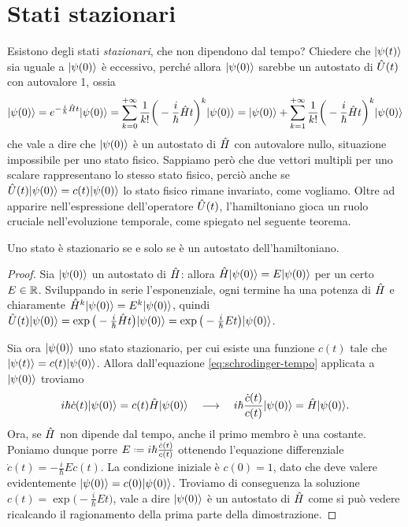 \section{Stati stazionari}
Esistono degli stati \emph{stazionari}, che non dipendono dal tempo?
Chiedere che $\lvert\psi(t)\rangle$ sia uguale a $\lvert\psi(0)\rangle$ è eccessivo, perch\'e allora $\lvert\psi(0)\rangle$ sarebbe un autostato di $\hat{U}(t)$ con autovalore 1, ossia
\begin{equation}
	\lvert\psi(0)\rangle=e^{-\frac{i}{\hbar}\hat{H}t}\lvert\psi(0)\rangle=\sum_{k=0}^{+\infty}\frac1{k!}\bigg(-\frac{i}{\hbar}\hat{H}t\bigg)^k\lvert\psi(0)\rangle=\lvert\psi(0)\rangle+\sum_{k=1}^{+\infty}\frac1{k!}\bigg(-\frac{i}{\hbar}\hat{H}t\bigg)^k\lvert\psi(0)\rangle
\end{equation}
che vale a dire che $\lvert\psi(0)\rangle$ è un autostato di $\hat{H}$ con autovalore nullo, situazione impossibile per uno stato fisico.
Sappiamo però che due vettori multipli per uno scalare rappresentano lo stesso stato fisico, perciò anche se $\hat{U}(t)\lvert\psi(0)\rangle=c(t)\lvert\psi(0)\rangle$ lo stato fisico rimane invariato, come vogliamo.
Oltre ad apparire nell'espressione dell'operatore $\hat{U}(t)$, l'hamiltoniano gioca un ruolo cruciale nell'evoluzione temporale, come spiegato nel seguente teorema.
\begin{teorema} \label{t:autostati-hamiltoniano-stazionari}
	Uno stato è stazionario se e solo se è un autostato dell'hamiltoniano.
\end{teorema}
\begin{proof}
	Sia $\lvert\psi(0)\rangle$ un autostato di $\hat{H}$: allora $\hat{H}\lvert\psi(0)\rangle=E\lvert\psi(0)\rangle$ per un certo $E\in\mathbb{R}$.
	Sviluppando in serie l'esponenziale, ogni termine ha una potenza di $\hat{H}$ e chiaramente $\hat{H}^k\lvert\psi(0)\rangle=E^k\lvert\psi(0)\rangle$, quindi $\hat{U}(t)\lvert\psi(0)\rangle=\exp\big(-\frac{i}{\hbar}\hat{H}t\big)\lvert\psi(0)\rangle=\exp\big(-\frac{i}{\hbar}Et\big)\lvert\psi(0)\rangle$.

	Sia ora $\lvert\psi(0)\rangle$ uno stato stazionario, per cui esiste una funzione $c(t)$ tale che $\lvert\psi(t)\rangle=c(t)\lvert\psi(0)\rangle$.
	Allora dall'equazione \eqref{eq:schrodinger-tempo} applicata a $\lvert\psi(0)\rangle$ troviamo
	\begin{equation}
		i\hbar\dot{c}(t)\lvert\psi(0)\rangle=c(t)\hat{H}\lvert\psi(0)\rangle\quad\longrightarrow\quad i\hbar\frac{\dot{c}(t)}{c(t)}\lvert\psi(0)\rangle=\hat{H}\lvert\psi(0)\rangle.
	\end{equation}
	Ora, se $\hat{H}$ non dipende dal tempo, anche il primo membro è una costante.
	Poniamo dunque porre $E\defeq i\hbar\frac{\dot{c}(t)}{c(t)}$ ottenendo l'equazione differenziale $\dot{c}(t)=-\frac{i}{\hbar}Ec(t)$.
	La condizione iniziale è $c(0)=1$, dato che deve valere evidentemente $\lvert\psi(0)\rangle=c(0)\lvert\psi(0)\rangle$.
	Troviamo di conseguenza la soluzione $c(t)=\exp\big(-\frac{i}{\hbar}Et\big)$, vale a dire $\lvert\psi(0)\rangle$ è un autostato di $\hat{H}$ come si può vedere ricalcando il ragionamento della prima parte della dimostrazione.
\end{proof}


